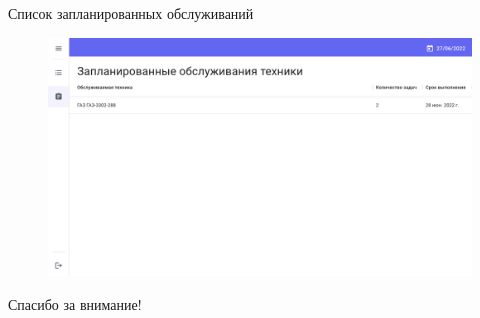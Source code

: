 \documentclass{beamer}
\begin{document}
\begin{frame}
	{Список запланированных обслуживаний}
    \begin{figure}[H]
        \centering
        \includegraphics[keepaspectratio,width=\textwidth]{presentation/images/tech.plumpalbert.xyz.maintenances.png}
    \end{figure}
\end{frame}

\begin{frame}
    \centering
    \huge{Спасибо за внимание!}
\end{frame}
\end{document}

